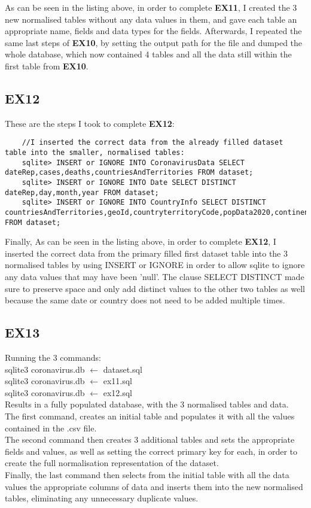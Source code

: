 \documentclass[10pt]{article}
\begin{document}
As can be seen in the listing above, in order to complete \textbf{EX11}, I created the 3 new normalised tables without any data values in them, and gave each table an appropriate name, fields and data types for the fields. Afterwards, I repeated the same last steps of \textbf{EX10}, by setting the output path for the file and dumped the whole database, which now contained 4 tables and all the data still within the first table from \textbf{EX10}.

\subsection{EX12}
These are the steps I took to complete \textbf{EX12}:
\begin{listing}[H]
    \begin{verbatim}
    //I inserted the correct data from the already filled dataset table into the smaller, normalised tables:
    sqlite> INSERT or IGNORE INTO CoronavirusData SELECT dateRep,cases,deaths,countriesAndTerritories FROM dataset;
    sqlite> INSERT or IGNORE INTO Date SELECT DISTINCT dateRep,day,month,year FROM dataset;
    sqlite> INSERT or IGNORE INTO CountryInfo SELECT DISTINCT countriesAndTerritories,geoId,countryterritoryCode,popData2020,continentExp FROM dataset;
    \end{verbatim}
\end{listing}

Finally, As can be seen in the listing above, in order to complete \textbf{EX12}, I inserted the correct data from the primary filled first dataset table into the 3 normalised tables by using INSERT or IGNORE in order to allow sqlite to ignore any data values that may have been 'null'. The clause SELECT DISTINCT made sure to preserve space and only add distinct values to the other two tables as well because the same date or country does not need to be added multiple times.

\subsection{EX13}
Running the 3 commands: \\
sqlite3 coronavirus.db $\leftarrow$ dataset.sql\\
sqlite3 coronavirus.db $\leftarrow$ ex11.sql\\
sqlite3 coronavirus.db $\leftarrow$ ex12.sql\\
Results in a fully populated database, with the 3 normalised tables and data.\\
The first command, creates an initial table and populates it with all the values contained in the .csv file.\\
The second command then creates 3 additional tables and sets the appropriate fields and values, as well as setting the correct primary key for each, in order to create the full normalisation representation of the dataset.\\
Finally, the last command then selects from the initial table with all the data values the appropriate columns of data and inserts them into the new normalised tables, eliminating any unnecessary duplicate values.
\end{document}
